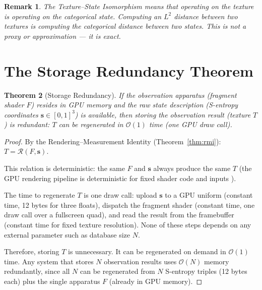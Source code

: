 \documentclass[11pt,twocolumn,a4paper]{article}
\newtheorem{theorem}{Theorem}[section]
\newtheorem{remark}[theorem]{Remark}
\newcommand{\BigO}{\mathcal{O}}
\newcommand{\Rend}{\mathcal{R}}
\begin{document}
\begin{remark}
The Texture--State Isomorphism means that operating on the texture
\emph{is} operating on the categorical state. Computing an $L^2$
distance between two textures \emph{is} computing the categorical
distance between two states. This is not a proxy or approximation ---
it is exact.
\end{remark}



\section{The Storage Redundancy Theorem}
\label{sec:storage-redundancy}

\begin{theorem}[Storage Redundancy]
\label{thm:storage-redundancy}
If the observation apparatus (fragment shader $F$) resides in GPU
memory and the raw state description (S-entropy coordinates
$\bm{s} \in [0,1]^3$) is available, then storing the observation
result (texture $T$) is redundant: $T$ can be regenerated in
$\BigO(1)$ time (one GPU draw call).
\end{theorem}

\begin{proof}
By the Rendering--Measurement Identity (Theorem~\ref{thm:rmi}):
$T = \Rend(F, \bm{s})$.

This relation is deterministic: the same $F$ and $\bm{s}$ always
produce the same $T$ (the GPU rendering pipeline is
deterministic for fixed shader code and inputs
\citep{khronosglsl,khronosvulkan}).

The time to regenerate $T$ is one draw call: upload $\bm{s}$ to a
GPU uniform (constant time, 12 bytes for three floats), dispatch
the fragment shader (constant time, one draw call over a fullscreen
quad), and read the result from the framebuffer (constant time for
fixed texture resolution). None of these steps depends on any
external parameter such as database size $N$.

Therefore, storing $T$ is unnecessary. It can be regenerated on
demand in $\BigO(1)$ time. Any system that stores $N$ observation
results uses $\BigO(N)$ memory redundantly, since all $N$ can be
regenerated from $N$ S-entropy triples (12 bytes each) plus the
single apparatus $F$ (already in GPU memory). \qedhere
\end{proof}
\end{document}
